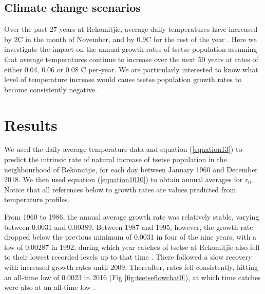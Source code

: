 \documentclass[12pt,a4paper]{article}
\begin{document}
\newpage
\subsection*{Climate change scenarios}

Over the past 27 years at Rekomitjie, average daily temperatures have increased by 2\textdegree C in the month of November, and by 0.9\textdegree C for the rest of the year \cite{Lord2018}.  Here we investigate the impact on the annual growth rates of tsetse population assuming that average temperatures continue to increase over the next 50 years at rates of either 0.04, 0.06 or 0.08 \textdegree C per-year. We are particularly interested to know what level of temperature increase would cause tsetse population growth rates to become consistently negative.

\section*{Results}
We used the daily average temperature data and equation (\ref{equation13}) to predict the intrinsic rate of natural increase of tsetse population in the neighbourhood of Rekomitjie, for each day between January 1960 and December 2018. We then used equation (\ref{equation1010}) to obtain annual averages for $r_0$. Notice that all references below to growth rates are values predicted from temperature profiles.   

From 1960 to 1986, the annual average growth rate was relatively stable, varying between 0.0031 and 0.00389.  Between 1987 and 1995, however, the growth rate dropped below the previous minimum of 0.0031 in four of the nine years, with a low of 0.00287 in 1992, during which year catches of tsetse at Rekomitjie also fell to their lowest recorded levels up to that time \cite{hargrove2015mortality}. There followed a slow recovery with increased growth rates until 2009. Thereafter, rates fell consistently, hitting an all-time low of 0.0023 in 2016 (Fig \ref{fig:tsetseflowchat0}), at which time catches were also at an all-time low \cite{Lord2018}.
\end{document}
